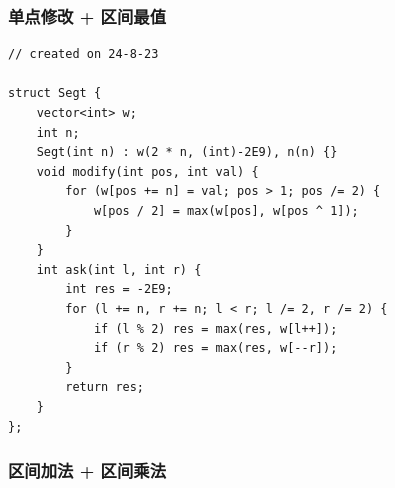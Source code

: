 \documentclass[a4paper,12pt]{article}
\begin{document}
\subsubsection{单点修改 + 区间最值}

\begin{lstlisting}
// created on 24-8-23

struct Segt {
    vector<int> w;
    int n;
    Segt(int n) : w(2 * n, (int)-2E9), n(n) {}
    void modify(int pos, int val) {
        for (w[pos += n] = val; pos > 1; pos /= 2) {
            w[pos / 2] = max(w[pos], w[pos ^ 1]);
        }
    }
    int ask(int l, int r) {
        int res = -2E9;
        for (l += n, r += n; l < r; l /= 2, r /= 2) {
            if (l % 2) res = max(res, w[l++]);
            if (r % 2) res = max(res, w[--r]);
        }
        return res;
    }
};   
\end{lstlisting}

\subsubsection{区间加法 + 区间乘法}
\end{document}
